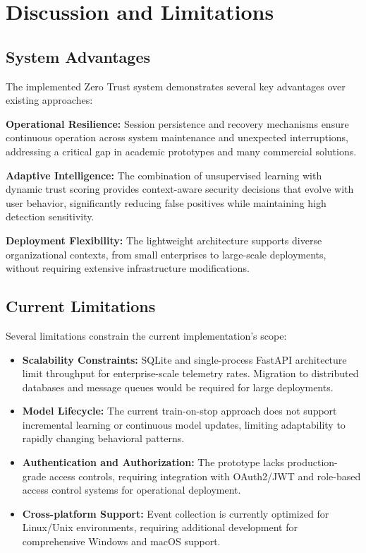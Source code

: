 \documentclass[conference]{IEEEtran}
\begin{document}
\section{Discussion and Limitations}

\subsection{System Advantages}
The implemented Zero Trust system demonstrates several key advantages over existing approaches:

\textbf{Operational Resilience:} Session persistence and recovery mechanisms ensure continuous operation across system maintenance and unexpected interruptions, addressing a critical gap in academic prototypes and many commercial solutions.

\textbf{Adaptive Intelligence:} The combination of unsupervised learning with dynamic trust scoring provides context-aware security decisions that evolve with user behavior, significantly reducing false positives while maintaining high detection sensitivity.

\textbf{Deployment Flexibility:} The lightweight architecture supports diverse organizational contexts, from small enterprises to large-scale deployments, without requiring extensive infrastructure modifications.

\subsection{Current Limitations}
Several limitations constrain the current implementation's scope:

\begin{itemize}[leftmargin=*]
  \item \textbf{Scalability Constraints:} SQLite and single-process FastAPI architecture limit throughput for enterprise-scale telemetry rates. Migration to distributed databases and message queues would be required for large deployments.
  \item \textbf{Model Lifecycle:} The current train-on-stop approach does not support incremental learning or continuous model updates, limiting adaptability to rapidly changing behavioral patterns.
  \item \textbf{Authentication and Authorization:} The prototype lacks production-grade access controls, requiring integration with OAuth2/JWT and role-based access control systems for operational deployment.
  \item \textbf{Cross-platform Support:} Event collection is currently optimized for Linux/Unix environments, requiring additional development for comprehensive Windows and macOS support.
\end{itemize}
\end{document}
